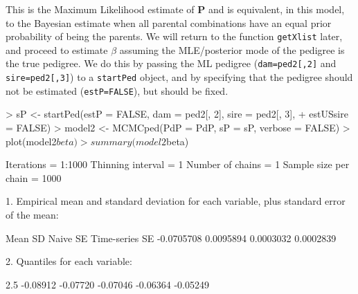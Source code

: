 \documentclass{article}
\begin{document}
This is the Maximum Likelihood estimate of ${\bm P}$ and is equivalent, in this model, to the Bayesian estimate when all parental combinations have an equal prior probability of being the parents.  We will return to the function \texttt{getXlist} later, and proceed to estimate $\beta$ assuming the MLE/posterior mode of the pedigree is the true pedigree.  We do this by passing the ML pedigree (\texttt{dam=ped2[,2]} and \texttt{sire=ped2[,3]}) to a \texttt{startPed} object, and by specifying that the pedigree should not be estimated (\texttt{estP=FALSE}), but should be fixed.

\begin{Schunk}
\begin{Sinput}
> sP <- startPed(estP = FALSE, dam = ped2[, 2], sire = ped2[, 3], 
+     estUSsire = FALSE)
> model2 <- MCMCped(PdP = PdP, sP = sP, verbose = FALSE)
> plot(model2$beta)
> summary(model2$beta)
\end{Sinput}
\begin{Soutput}
Iterations = 1:1000
Thinning interval = 1 
Number of chains = 1 
Sample size per chain = 1000 

1. Empirical mean and standard deviation for each variable,
   plus standard error of the mean:

          Mean             SD       Naive SE Time-series SE 
    -0.0705708      0.0095894      0.0003032      0.0002839 

2. Quantiles for each variable:

    2.5%
-0.08912 -0.07720 -0.07046 -0.06364 -0.05249 
\end{Soutput}
\end{Schunk}
\end{document}

